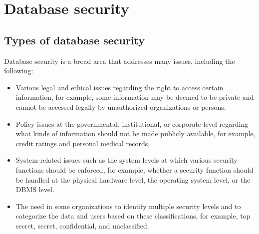 \documentclass[a4paper]{article}
\numberwithin{equation}{section}
\begin{document}
\pagebreak



\section{Database security}
\subsection{Types of database security}
Database security is a broad area that addresses many issues, including the following:
\begin{itemize}
  \item  Various legal and ethical issues regarding the right to access certain information, for example, some information may be deemed to be private and cannot be accessed legally by unauthorized organizations or persons.
  \item Policy issues at the governmental, institutional, or corporate level regarding what kinds of information should not be made publicly available, for example, credit ratings and personal medical records.
  \item System-related issues such as the system levels at which various security functions should be enforced, for example, whether a security function should be handled at the physical hardware level, the operating system level, or the DBMS level.
  \item The need in some organizations to identify multiple security levels and to categorize the data and users based on these classifications, for example, top secret, secret, confidential, and unclassified.
\end{itemize}
\end{document}
